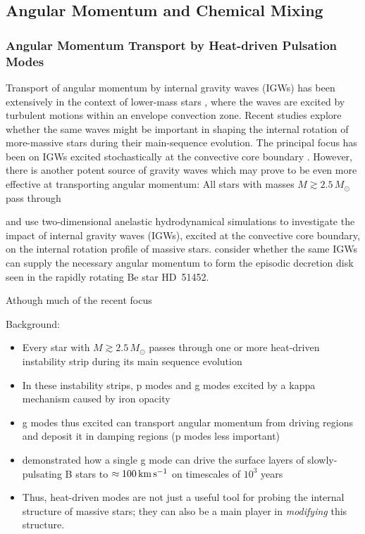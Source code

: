 
\subsection{Angular Momentum and Chemical Mixing}



{\color{brown}
\subsubsection{Angular Momentum Transport by Heat-driven Pulsation Modes}

Transport of angular momentum by internal gravity waves (IGWs) has been extensively in the context of lower-mass stars \citep[e.g.,][]{Schatzman:1993,Kumar:1997,Zahn:1997,Talon:2002,Talon:2005,Rogers:2008}, where the waves are excited by turbulent motions within an envelope convection zone. Recent studies explore whether the same waves might be important in shaping the internal rotation of more-massive stars during their main-sequence evolution. The principal focus has been on IGWs excited stochastically at the convective core boundary \citep[e.g.][]{Rogers:2013,Lee:2014,Rogers:2015}. However, there is another potent source of gravity waves which may prove to be even more effective at transporting angular momentum: All stars with masses $M \gtrsim 2.5\,M_{\odot}$ pass through 

\citet{Rogers:2013aa} and
\citet{Rogers:2015aa} use two-dimensional anelastic hydrodynamical
simulations to investigate the impact of internal gravity waves
(IGWs), excited at the convective core boundary, on the internal
rotation profile of massive stars. \citet{Lee:2014aa} consider whether
the same IGWs can supply the necessary angular momentum to form the
episodic decretion disk seen in the rapidly rotating Be star HD~51452.


Athough much of the recent focus 

Background:
 \begin{itemize}
 \item Every star with $M \gtrsim 2.5\,M_{\odot}$ passes through one or more heat-driven instability strip during its main sequence evolution
 \item In these instability strips, p modes and g modes excited by a kappa mechanism caused by iron opacity
 \item g modes thus excited can transport angular momentum from driving regions and deposit it in damping regions (p modes less important)
 \item \citet{Townsend:2017aa} demonstrated how a single g mode can drive the surface layers of slowly-pulsating B stars to $\approx 100\,{\rm km\,s^{-1}}$ on timescales of $10^{3}$ years
 \item Thus, heat-driven modes are not just a useful tool for probing the internal structure of massive stars; they can also be a main player in \emph{modifying} this structure.
 \end{itemize}
 
}
